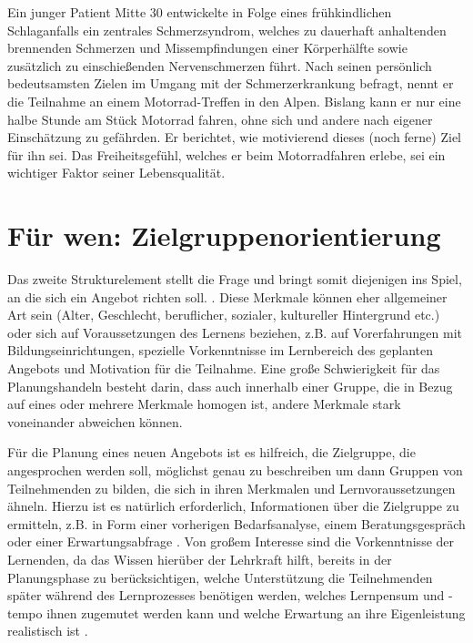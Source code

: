\documentclass[
  twoside,
  parskip=half-,
  paper=176mm:246mm,
  BCOR=14mm,
  DIV=14,
]{scrreprt}
\begin{document}
\begin{beispiel}
  Ein junger Patient Mitte 30 entwickelte in Folge eines frühkindlichen Schlaganfalls ein zentrales Schmerzsyndrom, welches zu dauerhaft anhaltenden brennenden Schmerzen und Missempfindungen einer Körperhälfte sowie zusätzlich zu einschießenden Nervenschmerzen führt. Nach seinen persönlich bedeutsamsten Zielen im Umgang mit der Schmerzerkrankung befragt, nennt er die Teilnahme an einem Motorrad-Treffen in den Alpen. Bislang kann er nur eine halbe Stunde am Stück Motorrad fahren, ohne sich und andere nach eigener Einschätzung zu gefährden. Er berichtet, wie motivierend dieses (noch ferne) Ziel für ihn sei. Das Freiheitsgefühl, welches er beim Motorradfahren erlebe, sei ein wichtiger Faktor seiner Lebensqualität. 
\end{beispiel}


\section{Für wen: Zielgruppenorientierung}

Das zweite Strukturelement stellt die Frage  und bringt somit diejenigen ins Spiel, an die sich ein Angebot richten soll.
. Diese Merkmale können eher allgemeiner Art sein (Alter, Geschlecht, beruflicher, sozialer, kultureller Hintergrund etc.) oder sich auf Voraussetzungen des Lernens beziehen, z.B. auf Vorerfahrungen mit Bildungseinrichtungen, spezielle Vorkenntnisse im Lernbereich des geplanten Angebots und Motivation für die Teilnahme. Eine große Schwierigkeit für das Planungshandeln besteht darin, dass auch innerhalb einer Gruppe, die in Bezug auf eines oder mehrere Merkmale homogen ist, andere Merkmale stark voneinander abweichen können.

Für die Planung eines neuen Angebots ist es hilfreich, die Zielgruppe, die angesprochen werden soll, möglichst genau zu beschreiben um dann Gruppen von Teilnehmenden zu bilden, die sich in ihren Merkmalen und Lernvoraussetzungen ähneln. Hierzu ist es natürlich erforderlich, Informationen über die Zielgruppe zu ermitteln, z.B. in Form einer vorherigen Bedarfsanalyse, einem Beratungsgespräch oder einer Erwartungsabfrage \autocite[vgl.][19]{kos}. Von großem Interesse sind die Vorkenntnisse der Lernenden, da das Wissen hierüber der Lehrkraft hilft, bereits in der Planungsphase zu berücksichtigen, welche Unterstützung die Teilnehmenden später während des Lernprozesses benötigen werden, welches Lernpensum und -tempo ihnen zugemutet werden kann und welche Erwartung an ihre Eigenleistung realistisch ist \autocite[vgl.][19]{kos}. 
\end{document}
